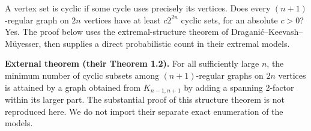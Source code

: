 A vertex set is cyclic if some cycle uses precisely its vertices. Does every $(n+1)$-regular graph on $2n$ vertices have at least $c2^{2n}$ cyclic sets, for an absolute $c>0$? Yes. The proof below uses the extremal-structure theorem of Dragani\'c--Keevash--M\"uyesser, then supplies a direct probabilistic count in their extremal models.

\textbf{External theorem (their Theorem 1.2).} For all sufficiently large $n$, the minimum number of cyclic subsets among $(n+1)$-regular graphs on $2n$ vertices is attained by a graph obtained from $K_{n-1,n+1}$ by adding a spanning 2-factor within its larger part.
The substantial proof of this structure theorem is not reproduced here. We do not import their separate exact enumeration of the models.
